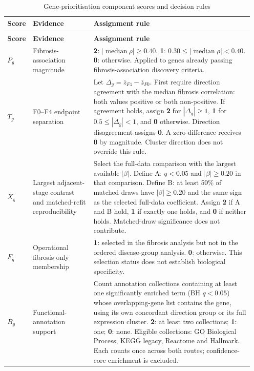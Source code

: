 \documentclass[11pt,a4paper]{article}
\begin{document}
\clearpage
\begingroup
\renewcommand{\thetable}{S\arabic{table}}
\renewcommand{\theHtable}{S\arabic{table}}
\setcounter{table}{2}
\fontsize{9}{11}\selectfont
\setlength{\tabcolsep}{4pt}
\renewcommand{\arraystretch}{1.15}
\begin{longtable}{>{\raggedright\arraybackslash}p{}>{\raggedright\arraybackslash}p{}>{\raggedright\arraybackslash}p{}}
\caption{Gene-prioritisation component scores and decision rules}\label{tab:S3}\\
\toprule
\textbf{Score} & \textbf{Evidence} & \textbf{Assignment rule} \\
\midrule\endfirsthead
\multicolumn{3}{l}{\textbf{Table S3 continued}}\\
\toprule
\textbf{Score} & \textbf{Evidence} & \textbf{Assignment rule} \\
\midrule\endhead
\bottomrule\endfoot
$P_g$ & Fibrosis-association magnitude & \textbf{2}: $|\operatorname{median}\rho|\geq0.40$. \textbf{1}: $0.30\leq|\operatorname{median}\rho|<0.40$. \textbf{0}: otherwise. Applied to genes already passing fibrosis-association discovery criteria. \\
$T_g$ & F0--F4 endpoint separation & Let $\Delta_g=\overline{z}_{F4}-\overline{z}_{F0}$. First require direction agreement with the median fibrosis correlation: both values positive or both non-positive. If agreement holds, assign \textbf{2} for $|\Delta_g|\geq1$, \textbf{1} for $0.5\leq|\Delta_g|<1$, and \textbf{0} otherwise. Direction disagreement assigns \textbf{0}. A zero difference receives \textbf{0} by magnitude. Cluster direction does not override this rule. \\
$X_g$ & Largest adjacent-stage contrast and matched-refit reproducibility & Select the full-data comparison with the largest available $|\beta|$. Define A: $q<0.05$ and $|\beta|\geq0.20$ in that comparison. Define B: at least 50\% of matched draws have $|\beta|\geq0.20$ and the same sign as the selected full-data coefficient. Assign \textbf{2} if A and B hold, \textbf{1} if exactly one holds, and \textbf{0} if neither holds. Matched-draw significance does not contribute. \\
$F_g$ & Operational fibrosis-only membership & \textbf{1}: selected in the fibrosis analysis but not in the ordered disease-group analysis. \textbf{0}: otherwise. This selection status does not establish biological specificity. \\
$B_g$ & Functional-annotation support & Count annotation collections containing at least one significantly enriched term (BH $q<0.05$) whose overlapping-gene list contains the gene, using its own concordant direction group or its full expression cluster. \textbf{2}: at least two collections; \textbf{1}: one; \textbf{0}: none. Eligible collections: GO Biological Process, KEGG legacy, Reactome and Hallmark. Each counts once across both routes; confidence-core enrichment is excluded. \\
\end{longtable}
\end{document}
